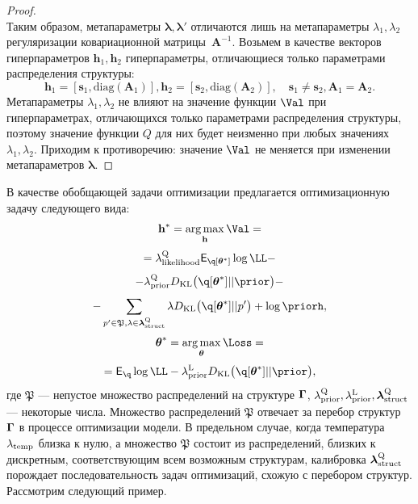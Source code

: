 \begin{proof}
\[\]
Таким образом, метапараметры $\boldsymbol{\lambda},\boldsymbol{\lambda}'$ отличаются лишь на метапараметры  $\lambda_1, \lambda_2$ регуляризации ковариационной матрицы~$\mathbf{A}^{-1}$. 
Возьмем в качестве векторов гиперпараметров $\mathbf{h}_1,\mathbf{h}_2$ гиперпараметры, отличающиеся только параметрами распределения структуры:
\[
    \mathbf{h}_1 = [\mathbf{s}_1, \text{diag}(\mathbf{A}_1)], \mathbf{h}_2 = [\mathbf{s}_2, \text{diag}(\mathbf{A}_2)],\quad \mathbf{s}_1 \neq \mathbf{s}_2, \mathbf{A}_1 = \mathbf{A}_2.
\]
Метапараметры $\lambda_1, \lambda_2$ не влияют на значение функции $\Val$ при гиперпараметрах, отличающихся только параметрами распределения структуры, поэтому значение функции $Q$ для них будет неизменно при любых значениях $\lambda_1, \lambda_2$. Приходим к противоречию: значение $\Val$ не меняется при изменении метапараметров $\boldsymbol{\lambda}$.

\end{proof}

В качестве обобщающей задачи оптимизации предлагается оптимизационную задачу следующего вида:
\begin{equation}
\label{eq:qopt}
\h^{*} = \argmax_{\h} \Val = 
\end{equation}
\[
= \lamLL \E_{\q[\teta^{*}]} \log\LL - 
\]
\[
    - \lamCQ \KL{\q[\teta^{*}]}{\prior} - 
\]
\[
    - \sum_{p' \in \mathfrak{P},\lambda \in \lamS} \lambda\KL{\q[\teta^{*}]}{p'} + \log\priorh, 
\]
\begin{equation}
\label{eq:lopt}
{\teta}^{*} = \argmax_{\teta} \Loss = 
\end{equation}
\[=
\E_{\q} \log \LL - \lamCL \KL{\q[\teta^{*}]}{\prior},
\]
где $\mathfrak{P}$ --- непустое множество распределений на структуре $\boldsymbol{\Gamma}$, $\lambda_\text{prior}^\text{Q}, \lambda_\text{prior}^\text{L}, \boldsymbol{\lambda}_\text{struct}^\text{Q}$  --- некоторые числа. Множество распределений $\mathfrak{P}$ отвечает за перебор структур $\boldsymbol{\Gamma}$ в процессе оптимизации модели.
В предельном случае, когда температура $\lambda_{\text{temp}}$ близка к нулю, а множество $\mathfrak{P}$ состоит из распределений, близких к дискретным, соответствующим всем возможным структурам, калибровка $\boldsymbol{\lambda}_\text{struct}^\text{Q}$ порождает последовательность задач оптимизаций, схожую с перебором структур. Рассмотрим следующий пример. 

